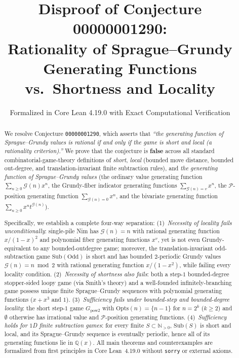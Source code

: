 \documentclass[11pt]{article}
\title{\textbf{Disproof of Conjecture 00000001290:\\
Rationality of Sprague--Grundy Generating Functions\\
vs.\ Shortness and Locality}}
\author{Formalized in Core Lean 4.19.0 with Exact Computational Verification}
\date{}
\theoremstyle{definition}
\theoremstyle{remark}
\newcommand{\N}{\mathbb{N}}
\newcommand{\Q}{\mathbb{Q}}
\newcommand{\G}{\mathcal{G}}
\newcommand{\Ppos}{\mathcal{P}}
\newcommand{\Opts}{\mathrm{Opts}}
\newcommand{\Sub}{\mathrm{Sub}}
\begin{document}
\maketitle

\begin{abstract}
We resolve Conjecture \texttt{00000001290}, which asserts that \emph{``the generating function of Sprague--Grundy values is rational if and only if the game is short and local (a rationality criterion).''}
We prove that the conjecture is \textbf{false} across all standard combinatorial-game-theory definitions of \emph{short}, \emph{local} (bounded move distance, bounded out-degree, and translation-invariant finite subtraction rules), and \emph{the generating function of Sprague--Grundy values} (the ordinary value generating function $\sum_{n \ge 0} \G(n) x^n$, the Grundy-fiber indicator generating functions $\sum_{\G(n)=v} x^n$, the $\Ppos$-position generating function $\sum_{\G(n)=0} x^n$, and the bivariate generating function $\sum_{n \ge 0} x^n t^{\G(n)}$).

Specifically, we establish a complete four-way separation:
(1)~\emph{Necessity of locality fails unconditionally}: single-pile Nim has $\G(n)=n$ with rational generating function $x/(1-x)^2$ and polynomial fiber generating functions $x^v$, yet is not even Grundy-equivalent to any bounded-outdegree game; moreover, the translation-invariant odd-subtraction game $\Sub(\mathrm{Odd})$ is short and has bounded $2$-periodic Grundy values $\G(n) = n \bmod 2$ with rational generating function $x/(1-x^2)$, while failing every locality condition.
(2)~\emph{Necessity of shortness also fails}: both a step-$1$ bounded-degree stopper-sided loopy game (via Smith's theory) and a well-founded infinitely-branching game possess unique finite Sprague--Grundy sequences with polynomial generating functions ($x + x^3$ and $1$).
(3)~\emph{Sufficiency fails under bounded-step and bounded-degree locality}: the short step-$1$ game $G_{\mathrm{pow2}}$ with $\Opts(n)=\{n-1\}$ for $n=2^k$ ($k \ge 2$) and $\emptyset$ otherwise has irrational value and $\Ppos$-position generating functions.
(4)~\emph{Sufficiency holds for $1$D finite subtraction games}: for every finite $S \subset \N_{>0}$, $\Sub(S)$ is short and local, and its Sprague--Grundy sequence is eventually periodic, hence all of its generating functions lie in $\Q(x)$.
All main theorems and counterexamples are formalized from first principles in Core Lean~4.19.0 without \texttt{sorry} or external axioms.
\end{abstract}
\end{document}
